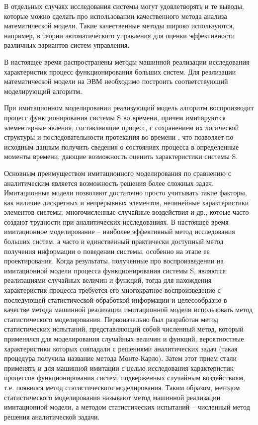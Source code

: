 \documentclass{article}
\begin{document}
    В отдельных случаях исследования системы могут удовлетворять и те выводы, которые можно сделать про использовании качественного метода анализа математической модели. Такие качественные методы широко используются, например, в теории автоматического управления для оценки эффективности различных вариантов систем управления.

    В настоящее время распространены методы машинной реализации исследования характеристик процесс функционирования больших систем. Для реализации математической модели на ЭВМ необходимо построить соответствующий моделирующий алгоритм.

    При имитационном моделировании реализующий модель алгоритм воспроизводит процесс функционирования системы S во времени, причем имитируются элементарные явления, составляющие процесс, с сохранением их логической структуры и последовательности протекания во времени , что позволяет по исходным данным получить сведения о состояниях процесса в определенные моменты времени, дающие возможность оценить характеристики системы S.

    Основным преимуществом имитационного моделирования по сравнению с аналитическим является возможность решения более сложных задач. Имитационные модели позволяют достаточно просто учитывать такие факторы, как наличие дискретных и непрерывных элементов, нелинейные характеристики элементов системы, многочисленные случайные воздействия и др., котоые часто создают трудности при аналитических исследованиях. В настоящее время имитационное моделирование -- наиболее эффективный метод исследования больших систем, а часто и единственный практически доступный метод получения информации о поведении системы, особенно на этапе ее проектирования.
    Когда результаты, полученные про воспроизведении на имитационной модели процесса функционирования системы S, являются реализациями случайных величин и функций, тогда для нахождения характеристик процесса требуется его многократное воспроизведение с последующей статистической обработкой информации и целесообразно в качестве метода машинной реализации имитационной модели использовать метод статистического моделирования. Первоначально был разработан метод статистических испытаний, представляющий собой численный метод, который применялся для моделирования случайных величин и функций, вероятностные характеристики которых совпадали с решениями аналитических задач (такая процедура получила название метода Монте-Карло). Затем этот прием стали применять и для машинной имитации с целью исследования характеристик процессов функционирования систем, подверженных случайным воздействиям, т.е. появился метод статистического моделирования. Таким образом, методом статистического моделирования называют метод машинной реализации имитационной модели, а методом статистических испытаний -- численный метод решения аналитической задачи.
\end{document}

